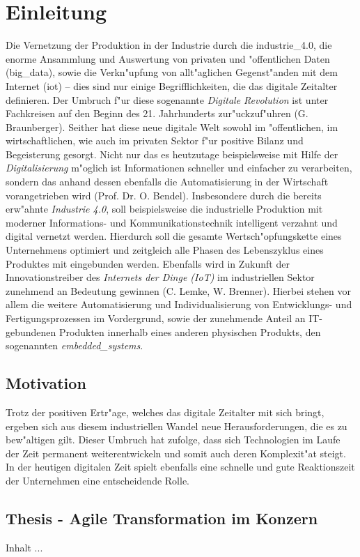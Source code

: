 
\chapter{Einleitung}
\minitoc
\vspace{1 cm} 

Die Vernetzung der Produktion in der Industrie durch die \gls{industrie_4.0}, die enorme 
Ansammlung und Auswertung von privaten und "offentlichen Daten (\gls{big_data}), sowie die 
Verkn"upfung von allt"aglichen Gegenst"anden mit dem Internet (\gls{iot}) -- dies sind nur
einige Begrifflichkeiten, die das digitale Zeitalter definieren. Der Umbruch f"ur diese 
sogenannte \textit{Digitale Revolution} ist unter Fachkreisen auf den Beginn des 21. 
Jahrhunderts zur"uckzuf"uhren \cite{qeins} (G. Braunberger). Seither hat diese neue digitale 
Welt sowohl im "offentlichen, im wirtschaftlichen, wie auch im privaten Sektor f"ur positive Bilanz 
und Begeisterung gesorgt. Nicht nur das es heutzutage beispielsweise mit Hilfe der 
\textit{Digitalisierung} m"oglich ist Informationen schneller und einfacher zu verarbeiten, 
sondern das anhand dessen ebenfalls die Automatisierung in der Wirtschaft vorangetrieben 
wird \cite{qzwei} (Prof. Dr. O. Bendel). Insbesondere durch die bereits erw"ahnte \textit{Industrie 4.0}, soll beispielsweise die industrielle Produktion mit moderner Informations- und Kommunikationstechnik intelligent verzahnt und digital vernetzt werden. Hierdurch soll die gesamte Wertsch"opfungskette eines Unternehmens optimiert und zeitgleich alle Phasen des Lebenszyklus eines Produktes mit eingebunden werden. Ebenfalls wird in Zukunft der Innovationstreiber des \textit{Internets der Dinge (IoT)} im industriellen Sektor zunehmend an Bedeutung gewinnen \cite{qdrei} (C. Lemke, W. Brenner). Hierbei stehen vor allem die weitere Automatisierung und Individualisierung von Entwicklungs- und Fertigungsprozessen im Vordergrund, sowie der zunehmende Anteil an IT-gebundenen Produkten innerhalb eines anderen physischen Produkts, den sogenannten \textit{\gls{embedded_systems}}.


\section{Motivation}
Trotz der positiven Ertr"age, welches das digitale Zeitalter mit sich bringt, ergeben sich aus diesem industriellen Wandel neue Herausforderungen, die es zu bew"altigen gilt. Dieser Umbruch hat zufolge, dass sich Technologien im Laufe der Zeit permanent weiterentwickeln und somit auch deren Komplexit"at steigt. In der heutigen digitalen Zeit spielt ebenfalls eine schnelle und gute Reaktionszeit der Unternehmen 
eine entscheidende Rolle. 

\section{Thesis - Agile Transformation im Konzern}
Inhalt ...



